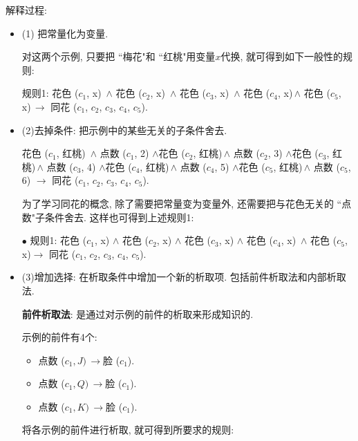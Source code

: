 解释过程:
\begin{itemize}
\item (1) 把常量化为变量.
\begin{example}
对这两个示例, 只要把 ``梅花"和 ``红桃"用变量$x$代换, 就可得到如下一般性的规则:

    规则1: 花色 ($c_1$, x)\, $\wedge$ 花色 ($c_2$, x)\, $\wedge$ 花色 ($c_3$, x)\, $\wedge$ 花色 ($c_4$, x)\,$\wedge$ 花色 ($c_5$, x)\,$\rightarrow$ 同花 ($c_1$, $c_2$, $c_3$, $c_4$, $c_5$).
\end{example}

\item (2)去掉条件: 把示例中的某些无关的子条件舍去.

\begin{example}
  花色 ($c_1$, 红桃)\, $\wedge$ 点数 ($c_1$, 2)
            $\wedge$花色 ($c_2$, 红桃)\,$\wedge$ 点数 ($c_2$, 3)
            $\wedge$花色 ($c_3$, 红桃)\,$\wedge$ 点数 ($c_3$, 4)
            $\wedge$花色 ($c_4$, 红桃)\,$\wedge$ 点数 ($c_4$, 5)
            $\wedge$花色 ($c_5$, 红桃)\,$\wedge$ 点数 ($c_5$, 6)
          $\rightarrow$ 同花 ($c_1$, $c_2$, $c_3$, $c_4$, $c_5$).
\end{example}

为了学习同花的概念, 除了需要把常量变为变量外, 还需要把与花色无关的 ``点数"子条件舍去. 这样也可得到上述规则1:

$\bullet$ 规则1: 花色 ($c_1$, x) $\wedge$ 花色 ($c_2$, x) $\wedge$ 花色 ($c_3$, x) $\wedge$ 花色 ($c_4$, x)\, $\wedge$ 花色 ($c_5$, x)$\rightarrow$ 同花 ($c_1$, $c_2$, $c_3$, $c_4$, $c_5$).

\item (3)增加选择: 在析取条件中增加一个新的析取项. 包括前件析取法和内部析取法.

 \textbf{前件析取法}: 是通过对示例的前件的析取来形成知识的.

\begin{example}\label{AIC7MLexam7.7}
示例的前件有4个:
\begin{itemize}
\item 点数 ($c_1, J)\,\rightarrow$脸 ($c_1$).
\item 点数 ($c_1, Q)\,\rightarrow$脸 ($c_1$).
\item 点数 ($c_1, K)\,\rightarrow$脸 ($c_1$).
\end{itemize}

将各示例的前件进行析取, 就可得到所要求的规则:


\end{example}
\end{itemize}
